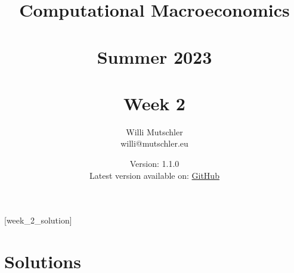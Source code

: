 
\newif\ifDisplaySolutions\DisplaySolutionstrue


\title{Computational Macroeconomics\\~\\Summer 2023\\~\\Week 2}
\author{Willi Mutschler\\willi@mutschler.eu}
\date{Version: 1.1.0\\Latest version available on: \href{https://github.com/wmutschl/Computational-Macroeconomics/releases/latest/download/week_2.pdf}{GitHub}}
\maketitle\thispagestyle{empty}

\newpage
{}[week_2_solution]
\tableofcontents\thispagestyle{empty}\newpage

\setcounter{page}{1}
\newpage
\newpage
\newpage
\printbibliography
\newpage

\ifDisplaySolutions
\newpage
\appendix
\section{Solutions}

\fi

